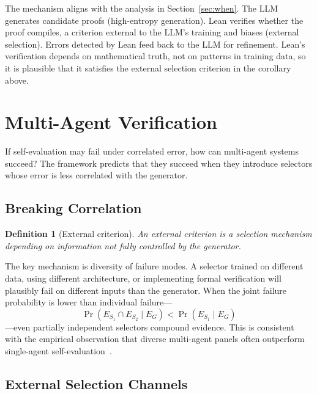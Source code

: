 \documentclass[11pt]{article}
\newtheorem{definition}[theorem]{Definition}
\begin{document}
The mechanism aligns with the analysis in Section~\ref{sec:when}. The LLM generates candidate proofs (high-entropy generation). Lean verifies whether the proof compiles, a criterion external to the LLM's training and biases (external selection). Errors detected by Lean feed back to the LLM for refinement. Lean's verification depends on mathematical truth, not on patterns in training data, so it is plausible that it satisfies the external selection criterion in the corollary above.

\section{Multi-Agent Verification}
\label{sec:multi}

If self-evaluation may fail under correlated error, how can multi-agent systems succeed? The framework predicts that they succeed when they introduce selectors whose error is less correlated with the generator.

\subsection{Breaking Correlation}

\begin{definition}[External criterion]
An external criterion is a selection mechanism depending on information not fully controlled by the generator.
\end{definition}

The key mechanism is diversity of failure modes. A selector trained on different data, using different architecture, or implementing formal verification will plausibly fail on different inputs than the generator. When the joint failure probability is lower than individual failure---
\begin{equation}
\Pr(E_{S_1} \cap E_{S_2} \mid E_G) < \Pr(E_{S_1} \mid E_G)
\end{equation}
---even partially independent selectors compound evidence. This is consistent with the empirical observation that diverse multi-agent panels often outperform single-agent self-evaluation~\citep{du2023debate, liang2023debate}.

\subsection{External Selection Channels}
\end{document}

